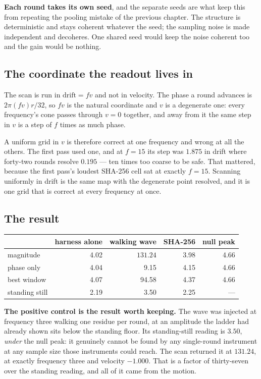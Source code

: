 \textbf{Each round takes its own seed}, and the separate seeds are what keep this from repeating the
pooling mistake of the previous chapter. The structure is deterministic and stays coherent whatever
the seed; the sampling noise is made independent and decoheres. One shared seed would keep the
noise coherent too and the gain would be nothing.

\subsection{The coordinate the readout lives in}

The scan is run in \(\text{drift} = f v\) and not in velocity. The phase a round advances is
\(2 \pi (f v) r / 32\), so \(fv\) is the natural coordinate and \(v\) is a degenerate one: every
frequency's cone passes through \(v = 0\) together, and away from it the same step in \(v\) is a
step of \(f\) times as much phase.

A uniform grid in \(v\) is therefore correct at one frequency and wrong at all the others. The
first pass used one, and at \(f = 15\) its step was \(1.875\) in drift where forty-two rounds
resolve \(0.195\) --- ten times too coarse to be safe. That mattered, because the first pass's
loudest SHA-256 cell sat at exactly \(f = 15\). Scanning uniformly in drift is the same map with
the degenerate point resolved, and it is one grid that is correct at every frequency at once.

\subsection{The result}

\begin{center}
\begin{tabular}{lrrrr}
\toprule
 & harness alone & walking wave & SHA-256 & null peak \\
\midrule
magnitude & 4.02 & \(\mathbf{131.24}\) & 3.98 & 4.66 \\
phase only & 4.04 & 9.15 & 4.15 & 4.66 \\
best window & 4.07 & 94.58 & 4.37 & 4.66 \\
standing still & 2.19 & 3.50 & 2.25 & --- \\
\bottomrule
\end{tabular}
\end{center}

\textbf{The positive control is the result worth keeping.} The wave was injected at frequency three
walking one residue per round, at an amplitude the ladder had already shown sits below the standing
floor. Its standing-still reading is \(3.50\), \emph{under} the null peak: it genuinely cannot be
found by any single-round instrument at any sample size those instruments could reach. The scan
returned it at \(131.24\), at exactly frequency three and velocity \(-1.000\). That is a factor of
thirty-seven over the standing reading, and all of it came from the motion.

